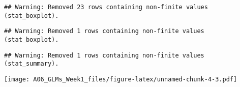 \documentclass[]{article}
\newenvironment{Shaded}{\begin{snugshade}}{\end{snugshade}}
\newcommand{\CommentTok}[1]{\textcolor[rgb]{0.56,0.35,0.01}{\textit{#1}}}
\newcommand{\DataTypeTok}[1]{\textcolor[rgb]{0.13,0.29,0.53}{#1}}
\newcommand{\DecValTok}[1]{\textcolor[rgb]{0.00,0.00,0.81}{#1}}
\newcommand{\KeywordTok}[1]{\textcolor[rgb]{0.13,0.29,0.53}{\textbf{#1}}}
\newcommand{\NormalTok}[1]{#1}
\newcommand{\OperatorTok}[1]{\textcolor[rgb]{0.81,0.36,0.00}{\textbf{#1}}}
\newcommand{\StringTok}[1]{\textcolor[rgb]{0.31,0.60,0.02}{#1}}
\begin{document}
\begin{Shaded}
\end{Shaded}

\begin{verbatim}
## Warning: Removed 23 rows containing non-finite values (stat_boxplot).
\end{verbatim}

\begin{verbatim}
## Warning: Removed 1 rows containing non-finite values (stat_boxplot).
\end{verbatim}

\begin{verbatim}
## Warning: Removed 1 rows containing non-finite values (stat_summary).
\end{verbatim}

\texttt{[image: A06\_GLMs\_Week1\_files/figure-latex/unnamed-chunk-4-3.pdf]}
\end{document}
